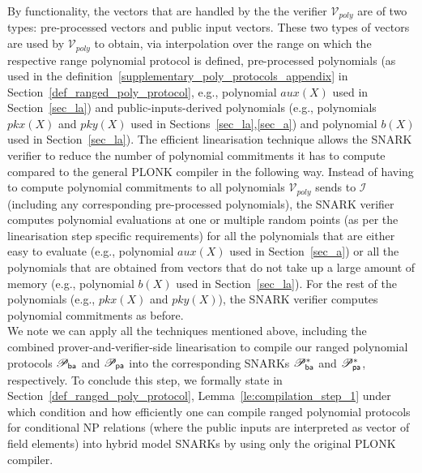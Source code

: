 \noindent By functionality, the vectors that are handled by the the verifier $\mathcal{V}_{poly}$ are 
of two types: pre-processed vectors and public input vectors. These two types of vectors are used by $\mathcal{V}_{poly}$ 
to obtain, via interpolation over the range on which the respective range polynomial protocol is defined, pre-processed polynomials 
(as used in the definition~\ref{supplementary_poly_protocols_appendix} in Section~\ref{def_ranged_poly_protocol}, e.g., polynomial $aux(X)$ used in Section~\ref{sec_la}) and 
public-inputs-derived polynomials (e.g., polynomials $pkx(X)$ and $pky(X)$ used in Sections~\ref{sec_la},\ref{sec_a})
and polynomial $b(X)$ used in Section~\ref{sec_la}). The efficient linearisation technique allows the SNARK verifier to reduce the 
number of polynomial commitments it has to compute compared to the general PLONK compiler in the following way. Instead of 
having to compute polynomial commitments to all polynomials $\mathcal{V}_{poly}$ sends to $\mathcal{I}$ (including any corresponding 
pre-processed polynomials), the SNARK verifier computes polynomial evaluations at one or multiple random points (as per the linearisation 
step specific requirements) for all the polynomials that are either easy to evaluate (e.g., polynomial $aux(X)$ used in Section~\ref{sec_a}) or 
all the polynomials that are obtained from vectors that do not take up a large amount of memory (e.g., polynomial $b(X)$ used in Section~\ref{sec_la}). 
For the rest of the polynomials (e.g., $\mathit{pkx}(X)$ and $\mathit{pky}(X)$), the SNARK verifier computes polynomial commitments as before.\\

\noindent We note we can apply all the techniques mentioned above, including the combined prover-and-verifier-side linearisation 
to compile our ranged polynomial protocols $\mathscr{P}_{\mathsf{ba}}$ and $\mathscr{P}_{\mathsf{pa}}$ into the corresponding SNARKs $\mathscr{P}_{\mathsf{ba}}^{\ast}$ and $\mathscr{P}_{\mathsf{pa}}^{\ast}$, respectively. 
To conclude this step, we formally state in Section~\ref{def_ranged_poly_protocol}, Lemma~\ref{le:compilation_step_1} under which condition and how efficiently 
one can compile ranged polynomial protocols for conditional NP relations (where the public inputs are interpreted as vector of field elements) 
into hybrid model SNARKs by using only the original PLONK compiler. \\
